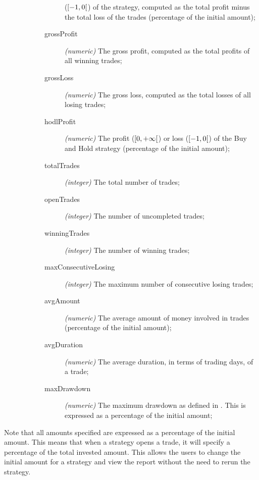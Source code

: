 \begin{description}
\begin{description}
\begin{description}
						(\(\interval[open
						right]{-1}{0}\)) of the
						strategy, computed as the total
						profit minus the total loss of
						the trades (percentage of the
						initial amount);
					\item[grossProfit] \textit{(numeric)}
						The gross profit, computed as
						the total profits of all winning
						trades;
					\item[grossLoss] \textit{(numeric)} The
						gross loss, computed as the
						total losses of all losing
						trades;
					\item[hodlProfit] \textit{(numeric)} The
						profit (\(\interval[open
						right]{0}{+\infty}\)) or loss
						(\(\interval[open
						right]{-1}{0}\)) of the Buy and
						Hold strategy (percentage of the
						initial amount);
					\item[totalTrades] \textit{(integer)}
						The total number of trades;
					\item[openTrades] \textit{(integer)} The
						number of uncompleted trades;
					\item[winningTrades] \textit{(integer)}
						The number of winning trades;
					\item[maxConsecutiveLosing]
						\textit{(integer)} The maximum
						number of consecutive losing
						trades;
					\item[avgAmount] \textit{(numeric)} The
						average amount of money involved
						in trades (percentage of the
						initial amount);
					\item[avgDuration] \textit{(numeric)}
						The average duration, in terms
						of trading days, of a trade;
					\item[maxDrawdown] \textit{(numeric)}
						The maximum drawdown as defined
						in . This is
						expressed as a percentage of the
						initial amount;
				\end{description}
		\end{description}
\end{description}

Note that all amounts specified are expressed as a percentage of the initial
amount. This means that when a strategy opens a trade, it will specify a
percentage of the total invested amount. This allows the users to change the
initial amount for a strategy and view the report without the need to rerun the
strategy.
